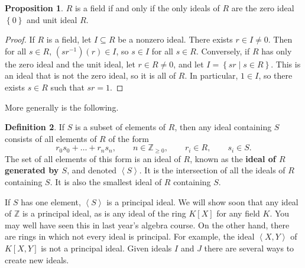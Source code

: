 \documentclass{article}
\newcommand{\Z}{\mathbb{Z}}
\newcommand{\rb}[1]{\left( #1 \right)}
\renewcommand{\sb}[1]{\left[ #1 \right]}
\newcommand{\cb}[1]{\left\{ #1 \right\}}
\newcommand{\ab}[1]{\left\langle #1 \right\rangle}
\theoremstyle{definition}\newtheorem{definition}{Definition}[subsection]
\theoremstyle{definition}\newtheorem{remark}[definition]{Remark}
\theoremstyle{definition}\newtheorem*{example}{Example}
\theoremstyle{definition}\newtheorem*{note}{Note}
\newtheorem{proposition}[definition]{Proposition}
\begin{document}
\begin{proposition}
$ R $ is a field if and only if the only ideals of $ R $ are the zero ideal $ \cb{0} $ and unit ideal $ R $.
\end{proposition}

\begin{proof}
If $ R $ is a field, let $ I \subseteq R $ be a nonzero ideal. There exists $ r \in I \ne 0 $. Then for all $ s \in R $, $ \rb{sr^{-1}}\rb{r} \in I $, so $ s \in I $ for all $ s \in R $. Conversely, if $ R $ has only the zero ideal and the unit ideal, let $ r \in R \ne 0 $, and let $ I = \cb{sr \mid s \in R} $. This is an ideal that is not the zero ideal, so it is all of $ R $. In particular, $ 1 \in I $, so there exists $ s \in R $ such that $ sr = 1 $.
\end{proof}

More generally is the following.

\begin{definition}
If $ S $ is a subset of elements of $ R $, then any ideal containing $ S $ consists of all elements of $ R $ of the form
$$ r_0s_0 + \dots + r_ns_n , \qquad n \in \Z_{\ge 0}, \qquad r_i \in R, \qquad s_i \in S. $$
The set of all elements of this form is an ideal of $ R $, known as the \textbf{ideal of $ R $ generated by $ S $}, and denoted $ \ab{S} $. It is the intersection of all the ideals of $ R $ containing $ S $. It is also the smallest ideal of $ R $ containing $ S $.
\end{definition}

If $ S $ has one element, $ \ab{S} $ is a principal ideal. We will show soon that any ideal of $ \Z $ is a principal ideal, as is any ideal of the ring $ K\sb{X} $ for any field $ K $. You may well have seen this in last year's
algebra course. On the other hand, there are rings in which not every ideal is principal. For example, the ideal $ \ab{X, Y} $ of $ K\sb{X, Y} $ is not a principal ideal. Given ideals $ I $ and $ J $ there are several ways to create new ideals.
\end{document}
